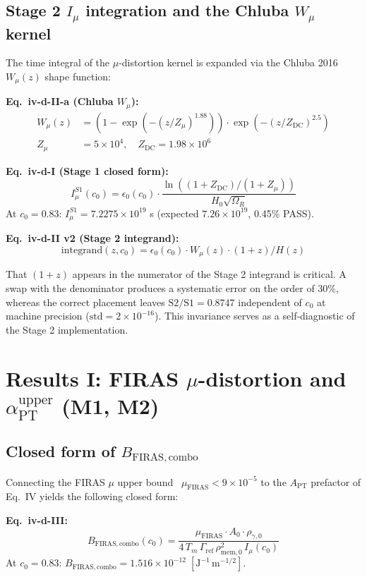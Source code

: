 \documentclass[11pt,a4paper]{article}
\newcommand{\epso}{\epsilon_0}
\newcommand{\Tm}{T_{m}}
\newcommand{\aPT}{\alpha_{\mathrm{PT}}}
\newcommand{\rhomem}{\rho_{\mathrm{mem},0}}
\newcommand{\rhog}{\rho_{\gamma,0}}
\newcommand{\Imu}{I_{\mu}}
\newcommand{\Wmu}{W_{\mu}}
\newcommand{\APT}{A_{\mathrm{PT}}}
\newcommand{\BFIRAS}{B_{\mathrm{FIRAS,combo}}}
\newcommand{\Gammaref}{\Gamma_{\mathrm{ref}}}
\newcommand{\muFIRAS}{\mu_{\mathrm{FIRAS}}}
\newcommand{\ZMU}{Z_{\mu}}
\newcommand{\ZDC}{Z_{\mathrm{DC}}}
\begin{document}
\subsection{Stage 2 $\Imu$ integration and the Chluba $\Wmu$ kernel}
The time integral of the $\mu$-distortion kernel is expanded via the Chluba 2016 $\Wmu(z)$ shape
function:

\begin{keybox}
\textbf{Eq.~iv-d-II-a (Chluba $\Wmu$):}
\begin{align*}
\Wmu(z) &= \left(1 - \exp\left(-\left(z/\ZMU\right)^{1.88}\right)\right) \cdot \exp\left(-\left(z/\ZDC\right)^{2.5}\right) \\
\ZMU &= 5 \times 10^{4},\quad \ZDC = 1.98 \times 10^{6}
\end{align*}

\textbf{Eq.~iv-d-I (Stage 1 closed form):}
\[
\Imu^{S1}(c_0) = \epso(c_0) \cdot \frac{\ln((1+\ZDC)/(1+\ZMU))}{H_0 \sqrt{\Omega_R}}
\]
At $c_0 = 0.83$: $\Imu^{S1} = 7.2275 \times 10^{19}$ s (expected $7.26 \times 10^{19}$, 0.45\% PASS).

\textbf{Eq.~iv-d-II v2 (Stage 2 integrand):}
\[
\text{integrand}(z, c_0) = \epso(c_0) \cdot \Wmu(z) \cdot (1+z) / H(z)
\]
\end{keybox}

That $(1+z)$ appears in the numerator of the Stage 2 integrand is critical. A swap with the
denominator produces a systematic error on the order of 30\%, whereas the correct placement leaves
$\mathrm{S2/S1} = 0.8747$ independent of $c_0$ at machine precision
($\mathrm{std} = 2 \times 10^{-16}$). This invariance serves as a self-diagnostic of the Stage 2
implementation.

\section{Results I: FIRAS $\mu$-distortion and $\aPT^{\mathrm{upper}}$ (M1, M2)}

\subsection{Closed form of $\BFIRAS$}
Connecting the FIRAS $\mu$ upper bound~\citep{Fixsen1996} $\muFIRAS < 9 \times 10^{-5}$ to the
$\APT$ prefactor of Eq.~IV yields the following closed form:

\begin{keybox}
\textbf{Eq.~iv-d-III:}
\[
\BFIRAS(c_0) = \frac{\muFIRAS \cdot A_0 \cdot \rhog}{4\,\Tm\,\Gammaref\,\rhomem^2\,\Imu(c_0)}
\]
At $c_0 = 0.83$: $\BFIRAS = 1.516 \times 10^{-12}\;[\mathrm{J}^{-1}\,\mathrm{m}^{-1/2}]$.
\end{keybox}
\end{document}
